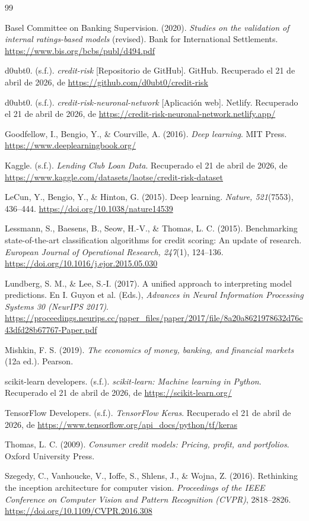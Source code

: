 \documentclass[12pt,a4paper]{article}
\begin{document}
\begin{thebibliography}{99}

Basel Committee on Banking Supervision. (2020). \textit{Studies on the validation of internal ratings-based models} (revised). Bank for International Settlements. \url{https://www.bis.org/bcbs/publ/d494.pdf}

d0ubt0. (s.f.). \textit{credit-risk} [Repositorio de GitHub]. GitHub. Recuperado el 21 de abril de 2026, de \url{https://github.com/d0ubt0/credit-risk}

d0ubt0. (s.f.). \textit{credit-risk-neuronal-network} [Aplicación web]. Netlify. Recuperado el 21 de abril de 2026, de \url{https://credit-risk-neuronal-network.netlify.app/}

Goodfellow, I., Bengio, Y., \& Courville, A. (2016). \textit{Deep learning}. MIT Press. \url{https://www.deeplearningbook.org/}

Kaggle. (s.f.). \textit{Lending Club Loan Data}. Recuperado el 21 de abril de 2026, de \url{https://www.kaggle.com/datasets/laotse/credit-risk-dataset}

LeCun, Y., Bengio, Y., \& Hinton, G. (2015). Deep learning. \textit{Nature, 521}(7553), 436--444. \url{https://doi.org/10.1038/nature14539}

Lessmann, S., Baesens, B., Seow, H.-V., \& Thomas, L. C. (2015). Benchmarking state-of-the-art classification algorithms for credit scoring: An update of research. \textit{European Journal of Operational Research, 247}(1), 124--136. \url{https://doi.org/10.1016/j.ejor.2015.05.030}

Lundberg, S. M., \& Lee, S.-I. (2017). A unified approach to interpreting model predictions. En I. Guyon et al. (Eds.), \textit{Advances in Neural Information Processing Systems 30 (NeurIPS 2017)}. \url{https://proceedings.neurips.cc/paper_files/paper/2017/file/8a20a8621978632d76c43dfd28b67767-Paper.pdf}

Mishkin, F. S. (2019). \textit{The economics of money, banking, and financial markets} (12a ed.). Pearson.

scikit-learn developers. (s.f.). \textit{scikit-learn: Machine learning in Python}. Recuperado el 21 de abril de 2026, de \url{https://scikit-learn.org/}

TensorFlow Developers. (s.f.). \textit{TensorFlow Keras}. Recuperado el 21 de abril de 2026, de \url{https://www.tensorflow.org/api_docs/python/tf/keras}

Thomas, L. C. (2009). \textit{Consumer credit models: Pricing, profit, and portfolios}. Oxford University Press.

Szegedy, C., Vanhoucke, V., Ioffe, S., Shlens, J., \& Wojna, Z. (2016). Rethinking the inception architecture for computer vision. \textit{Proceedings of the IEEE Conference on Computer Vision and Pattern Recognition (CVPR)}, 2818--2826. \url{https://doi.org/10.1109/CVPR.2016.308}

\end{thebibliography}
\end{document}

